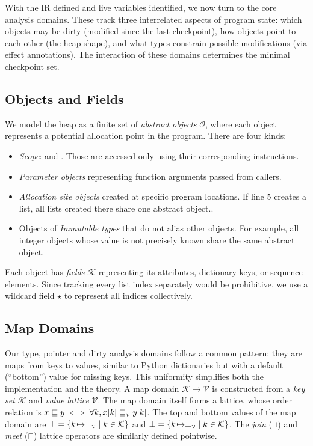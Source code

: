 With the IR defined and live variables identified, we now turn to the core analysis domains. These track three interrelated aspects of program state: which objects may be dirty (modified since the last checkpoint), how objects point to each other (the heap shape), and what types constrain possible modifications (via effect annotations). The interaction of these domains determines the minimal checkpoint set.

\subsection{Objects and Fields}
We model the heap as a finite set of \emph{abstract objects} $\mathcal{O}$, where each object represents a potential allocation point in the program. There are four kinds:
\begin{itemize}
    \item \emph{Scope}: \tLOCALS and \tGLOBALS. Those are accessed only using their corresponding instructions.
    \item \emph{Parameter objects} representing function arguments passed from callers.
    \item \emph{Allocation site objects} created at specific program locations. If line 5 creates a list, all lists created there share one abstract object..
    \item Objects of \emph{Immutable types} that do not alias other objects. For example, all integer objects whose value is not precisely known share the same abstract object.
\end{itemize}
Each object has \emph{fields} $\mathcal{K}$ representing its attributes, dictionary keys, or sequence elements. Since tracking every list index separately would be prohibitive, we use a wildcard field $\star$ to represent all indices collectively.

\subsection{Map Domains}
Our type, pointer and dirty analysis domains follow a common pattern: they are maps from keys to values, similar to Python dictionaries but with a default (``bottom'') value for missing keys. This uniformity simplifies both the implementation and the theory.
A map domain $\mathcal{K}\to\mathcal{V}$ is constructed from a \emph{key set} $\mathcal{K}$ and \emph{value lattice} $\mathcal{V}$.
The map domain itself forms a lattice, whose order relation is 
$x\sqsubseteq y \iff \forall k,x[k]\sqsubseteq_{\scriptscriptstyle\mathcal{V}}y[k]$.
The top and bottom values of the map domain are
$\top=\{k{\hspace{1pt}\mapsto}\top_{\scriptscriptstyle\mathcal{V}}\mid k\in\mathcal{K}\}$
and
$\bot=\{k{\hspace{1pt}\mapsto}\bot_{\scriptscriptstyle\mathcal{V}}\mid k\in\mathcal{K}\}$.
The \emph{join} ($\sqcup$) and \emph{meet} ($\sqcap$) lattice operators are similarly defined pointwise.

